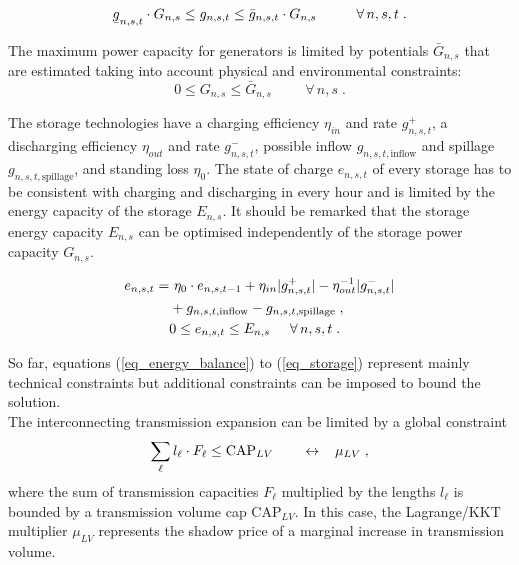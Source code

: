 \documentclass[3p]{elsarticle} %
\newcommand{\ubar}[1]{\text{\b{$#1$}}}
\begin{document}
\begin{equation}
\ubar{g}_{n,s,t} \cdot G_{n,s} \leq g_{n,s,t} \leq \bar{g}_{n,s,t} \cdot G_{n,s} \hspace{1cm} \forall\, n,s,t \; . \label{eq_g}
\end{equation}

The maximum power capacity for generators is limited by potentials $\bar{G}_{n,s}$ that are estimated taking into account physical and environmental constraints:
\begin{equation}\label{eq_max_G}
0 \leq G_{n,s}\leq \bar{G}_{n,s} \hspace{1cm} \forall\, n,s \; .
\end{equation}

The storage technologies have a charging efficiency $\eta_{in}$ and rate $g_{n,s,t}^+$, a discharging efficiency $\eta_{out}$ and rate $g_{n,s,t}^-$, possible inflow $g_{n,s,t,\textrm{inflow}}$ and spillage $g_{n,s,t,\textrm{spillage}}$, and standing loss $\eta_0$. The state of charge $e_{n,s,t}$ of every storage has to be consistent with charging and discharging in every hour and is limited by the energy capacity of the storage $E_{n,s}$. It should be remarked that the storage energy capacity $E_{n,s}$ can be optimised independently of the storage power capacity $G_{n,s}$.

\begin{align}
e_{n,s,t} = & \ \eta_0 \cdot e_{n,s,t-1} + \eta_{in} |g_{n,s,t}^+| - \eta_{out}^{-1} |g_{n,s,t}^-| \nonumber \\
& + g_{n,s,t,\textrm{inflow}} - g_{n,s,t,\textrm{spillage}} \; , \nonumber \\
& 0  \leq   e_{n,s,t} \leq E_{n,s}   \hspace{0.5cm} \forall\, n,s,t \; . \label{eq_storage}
\end{align}

So far, equations (\ref{eq_energy_balance}) to (\ref{eq_storage}) represent mainly technical constraints but additional constraints can be imposed to bound the solution.\\

The interconnecting transmission expansion can be limited by a global constraint
\begin{equation}
\sum_{\ell} l_\ell \cdot F_{\ell} \leq  \textrm{CAP}_{LV} \hspace{.7cm} \leftrightarrow \hspace{0.3cm} \mu_{LV} \; ,
\label{eq_cap}
\end{equation}
where the sum of transmission capacities $F_{\ell}$ multiplied by the lengths $l_{\ell}$ is bounded by a transmission volume cap $\textrm{CAP}_{LV}$. In this case, the Lagrange/KKT multiplier $\mu_{LV}$ represents the shadow price of a marginal increase in transmission volume.\\
\end{document}
